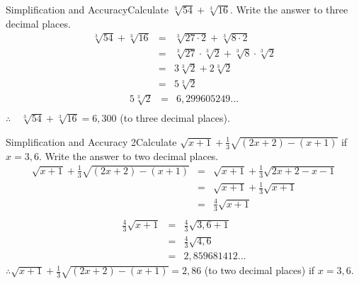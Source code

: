 
\begin{wex}{Simplification and Accuracy}{Calculate $\sqrt[3]{54}+\sqrt[3]{16}$. Write the answer to three decimal places.}{
\begin{eqnarray*}
\sqrt[3]{54}+\sqrt[3]{16}&=&\sqrt[3]{27 \cdot 2}+\sqrt[3]{8 \cdot 2}\\
&=&\sqrt[3]{27} \cdot \sqrt[3]{2}+\sqrt[3]{8} \cdot \sqrt[3]{2}\\
&=&3 \sqrt[3]{2}+2 \sqrt[3]{2}\\
&=&5 \sqrt[3]{2}
\end{eqnarray*}
\begin{eqnarray*}
5 \sqrt[3]{2}&=&6,299605249\ldots\\
\end{eqnarray*}
$\therefore \quad \sqrt[3]{54}+\sqrt[3]{16}=6,300$ (to three decimal places).}
\end{wex}

\begin{wex}{Simplification and Accuracy 2}{Calculate $\sqrt{x+1}+\frac{1}{3}\sqrt{(2x+2)-(x+1)}$ if $x=3,6$. Write the answer to two decimal places.}{
\begin{eqnarray*}
\sqrt{x+1}+\frac{1}{3}\sqrt{(2x+2)-(x+1)}&=&\sqrt{x+1}+\frac{1}{3}\sqrt{2x+2-x-1}\\
&=&\sqrt{x+1}+\frac{1}{3}\sqrt{x+1}\\
&=&\frac{4}{3}\sqrt{x+1}\\
\end{eqnarray*}
\begin{eqnarray*}
\frac{4}{3}\sqrt{x+1}&=&\frac{4}{3}\sqrt{3,6+1}\\
&=&\frac{4}{3}\sqrt{4,6}\\
&=&2,859681412 \ldots
\end{eqnarray*}
$\therefore \sqrt{x+1}+\frac{1}{3}\sqrt{(2x+2)-(x+1)}=2,86$ (to two decimal places) if $x=3,6$.}
\end{wex}

